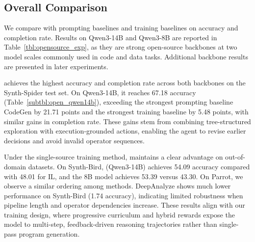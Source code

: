 \subsection{Overall Comparison}
\label{expsec:overall_comparison}


% 

% 
% 
% 


We compare \sys with prompting baselines and training baselines on accuracy and completion rate. 
Results on Qwen3-14B and Qwen3-8B are reported in Table~\ref{tbl:opensource_exp}, as they are strong open-source backbones at two model scales commonly used in code and data tasks. Additional backbone results are presented in later experiments.

\sys achieves the highest accuracy and completion rate across both backbones on the Synth-Spider test set. On Qwen3-14B, it reaches 67.18 accuracy (Table~\ref{subtbl:open_qwen14b}), exceeding the strongest prompting baseline CodeGen by 21.71 points and the strongest training baseline by 5.48 points, with similar gains in completion rate.
These gains stem from combining tree-structured exploration with execution-grounded actions, enabling the agent to revise earlier decisions and avoid invalid operator sequences.

Under the single-source training method, \sys maintains a clear advantage on out-of-domain datasets. On Synth-Bird, \sys (Qwen3-14B) achieves 54.09 accuracy compared with 48.01 for IL, and the 8B model achieves 53.39 versus 43.30. On Parrot, we observe a similar ordering among methods. DeepAnalyze shows much lower performance on Synth-Bird (1.74 accuracy), indicating limited robustness when pipeline length and operator dependencies increase. These results align with our training design, where progressive curriculum and hybrid rewards expose the model to multi-step, feedback-driven reasoning trajectories rather than single-pass program generation.


